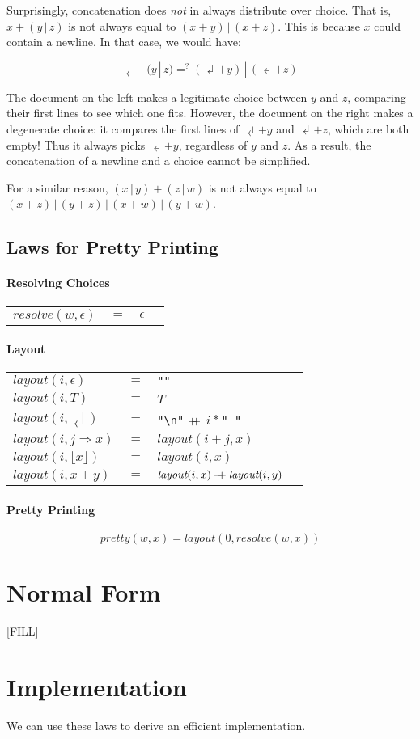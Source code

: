 \documentclass{article}
\makeatletter
\newenvironment{Table}
  {\begin{center}\begin{tabular}{l @{\;\;} l @{\;\;} l @{\quad\quad} l}}
  {\end{tabular}\end{center}}
\newcommand{\pp}[2]{\textit{pretty}(#1, #2)}
\newcommand{\layout}[2]{\textit{layout}(#1, #2)}
\newcommand{\resolve}[2]{\textit{resolve}(#1, #2)}
\newcommand{\txt}{T}
\newcommand{\nil}{{\epsilon}}
\newcommand{\nl}{{\dlsh}}
\newcommand{\ind}[2]{#1 \Rightarrow #2}
\renewcommand{\flat}[1]{\lfloor #1 \rfloor}
\newcommand{\cat}[2]{#1 + #2}
\newcommand{\choice}[2]{#1 \,|\, #2}
\newcommand{\doubleplus}{\mathbin{+\mkern-8mu+}}
\makeatother
\begin{document}
Surprisingly, concatenation does \emph{not} in always distribute over choice. That is,
$\cat{x}{(\choice{y}{z})}$ is not always equal to $\choice{(\cat{x}{y})}{(\cat{x}{z})}$.  This is
because $x$ could contain a newline. In that case, we would have:

\[ \cat{\nl}{(\choice{y}{z})} =^? \choice{(\cat{\nl}{y})}{(\cat{\nl}{z})} \]

The document on the left makes a legitimate choice between $y$ and $z$, comparing their first lines
to see which one fits. However, the document on the right makes a degenerate choice: it compares the
first lines of $\cat{\nl}{y}$ and $\cat{\nl}{z}$, which are both empty! Thus it always picks
$\cat{\nl}{y}$, regardless of $y$ and $z$.  As a result, the concatenation of a newline and a choice
cannot be simplified.

For a similar reason, $\cat{(\choice{x}{y})}{(\choice{z}{w})}$ is not always equal to
$\choice{\choice{(\cat{x}{z})}{(\cat{y}{z})}}{\choice{(\cat{x}{w})}{(\cat{y}{w})}}$.

\subsection{Laws for Pretty Printing}

\paragraph{Resolving Choices}

\begin{Table}
$\resolve{w}{\nil}$ &$=$& $\nil$ \\
\end{Table}

\paragraph{Layout}

\begin{Table}
$\layout{i}{\nil}$ &$=$& \texttt{""} \\
$\layout{i}{\txt}$ &$=$& $\txt$ \\
$\layout{i}{\nl}$ &$=$& \texttt{"{\textbackslash}n"} $\doubleplus$ $i*$\texttt{" "} \\
$\layout{i}{\ind{j}{x}}$ &$=$& $\layout{i+j}{x}$ \\
$\layout{i}{\flat{x}}$ &$=$& $\layout{i}{x}$ \\
$\layout{i}{\cat{x}{y}}$ &$=$& $\layout{i}{x} \doubleplus \layout{i}{y}$ \\
\end{Table}

\paragraph{Pretty Printing}

\[ \pp{w}{x} = \layout{0}{\resolve{w}{x}} \]

\section{Normal Form}

[FILL]

\section{Implementation}

We can use these laws to derive an efficient implementation.
\end{document}

